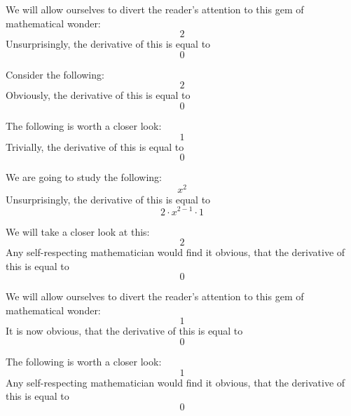 \documentclass{article}
\begin{document}
We will allow ourselves to divert the reader's attention to this gem of mathematical wonder:
\begin{equation}
2 
\end{equation}
Unsurprisingly, the derivative of this is equal to
\begin{equation}
0 
\end{equation}

Consider the following:
\begin{equation}
2 
\end{equation}
Obviously, the derivative of this is equal to
\begin{equation}
0 
\end{equation}

The following is worth a closer look:
\begin{equation}
1 
\end{equation}
Trivially, the derivative of this is equal to
\begin{equation}
0 
\end{equation}

We are going to study the following:
\begin{equation}
x ^{2 } 
\end{equation}
Unsurprisingly, the derivative of this is equal to
\begin{equation}
2 \cdot x ^{2 - 1 } \cdot 1 
\end{equation}

We will take a closer look at this:
\begin{equation}
2 
\end{equation}
Any self-respecting mathematician would find it obvious, that the derivative of this is equal to
\begin{equation}
0 
\end{equation}

We will allow ourselves to divert the reader's attention to this gem of mathematical wonder:
\begin{equation}
1 
\end{equation}
It is now obvious, that the derivative of this is equal to
\begin{equation}
0 
\end{equation}

The following is worth a closer look:
\begin{equation}
1 
\end{equation}
Any self-respecting mathematician would find it obvious, that the derivative of this is equal to
\begin{equation}
0 
\end{equation}
\end{document}
